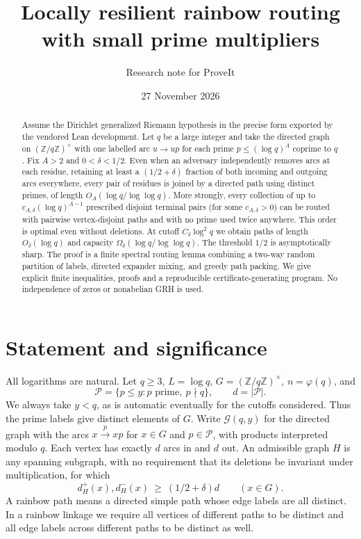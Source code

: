 \documentclass[11pt]{article}
\title{Locally resilient rainbow routing\\with small prime multipliers}
\author{Research note for ProveIt}
\date{27 November 2026}
\theoremstyle{remark}\newtheorem{remark}[theorem]{Remark}
\newcommand{\G}{\mathcal G}
\newcommand{\Pp}{\mathcal P}
\newcommand{\abs}[1]{\lvert#1\rvert}
\newcommand{\Z}{\mathbb Z}
\newcommand{\ph}{\varphi}
\begin{document}
\maketitle
\begin{abstract}
Assume the Dirichlet generalized Riemann hypothesis in the precise form exported by the vendored Lean development. Let $q$ be a large integer and take the directed graph on $(\Z/q\Z)^\times$ with one labelled arc $u\to up$ for each prime $p\le(\log q)^A$ coprime to $q$. Fix $A>2$ and $0<\delta<1/2$. Even when an adversary independently removes arcs at each residue, retaining at least a $(1/2+\delta)$ fraction of both incoming and outgoing arcs everywhere, every pair of residues is joined by a directed path using distinct primes, of length $O_A(\log q/\log\log q)$. More strongly, every collection of up to $c_{A,\delta}(\log q)^{A-1}$ prescribed disjoint terminal pairs (for some $c_{A,\delta}>0$) can be routed with pairwise vertex-disjoint paths and with no prime used twice anywhere. This order is optimal even without deletions. At cutoff $C_\delta\log^2q$ we obtain paths of length $O_\delta(\log q)$ and capacity $\Omega_\delta(\log q/\log\log q)$. The threshold $1/2$ is asymptotically sharp. The proof is a finite spectral routing lemma combining a two-way random partition of labels, directed expander mixing, and greedy path packing. We give explicit finite inequalities, proofs and a reproducible certificate-generating program. No independence of zeros or nonabelian GRH is used.
\end{abstract}

\section{Statement and significance}
All logarithms are natural. Let $q\ge3$, $L=\log q$, $G=(\Z/q\Z)^\times$, $n=\ph(q)$, and
\[
 \Pp=\{p\le y:p\text{ prime},\ p\nmid q\},\qquad d=\abs{\Pp}.
\]
We always take $y<q$, as is automatic eventually for the cutoffs considered. Thus the prime labels give distinct elements of $G$. Write $\G(q,y)$ for the directed graph with the arcs $x\xrightarrow{p}xp$ for $x\in G$ and $p\in\Pp$, with products interpreted modulo $q$. Each vertex has exactly $d$ arcs in and $d$ out. An admissible graph $H$ is any spanning subgraph, with no requirement that its deletions be invariant under multiplication, for which
\begin{equation}\label{eq:min}
 d_H^+(x),d_H^-(x)\ \ge\ (1/2+\delta)d\qquad (x\in G).
\end{equation}
A rainbow path means a directed simple path whose edge labels are all distinct. In a rainbow linkage we require all vertices of different paths to be distinct and all edge labels across different paths to be distinct as well.
\end{document}
